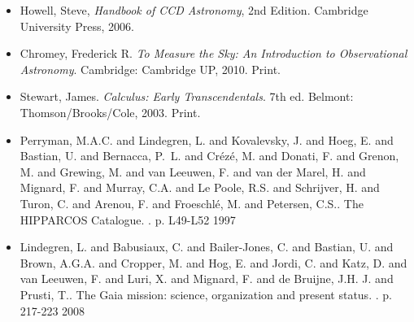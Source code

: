 \documentclass[authoryear, 12pt,5p, times]{elsarticle}
\begin{document}
 \begin{footnotesize}
 \begin{itemize}
\item Howell, Steve,  \textit{Handbook of CCD Astronomy}, 2nd Edition. Cambridge University Press, 2006.
\item Chromey, Frederick R. \textit{To Measure the Sky: An Introduction to Observational Astronomy}. Cambridge: Cambridge UP, 2010. Print.
\item Stewart, James. \textit{Calculus: Early Transcendentals}. 7th ed. Belmont: Thomson/Brooks/Cole, 2003. Print.
\item Perryman, M.A.C. and Lindegren, L. and Kovalevsky, J. and Hoeg, E. and Bastian, U. and Bernacca, P.~L. and Cr{\'ez\'e}, M. and Donati, F. and Grenon, M. and Grewing, M. and van Leeuwen, F. and van der Marel, H. and Mignard, F. and Murray, C.A. and Le Poole, R.S. and Schrijver, H. and Turon, C. and Arenou, F. and Froeschl{\'e}, M. and Petersen, C.S.. The HIPPARCOS Catalogue. . p. L49-L52 1997
\item  Lindegren, L. and Babusiaux, C. and Bailer-Jones, C. and Bastian, U. and Brown, A.G.A. and Cropper, M. and Hog, E. and Jordi, C. and Katz, D. and van Leeuwen, F. and Luri, X. and Mignard, F. and de Bruijne, J.H. J. and Prusti, T.. The Gaia mission: science, organization and present status. . p. 217-223 2008
\end{itemize}
% 
%
  \end{footnotesize}
\end{document}
